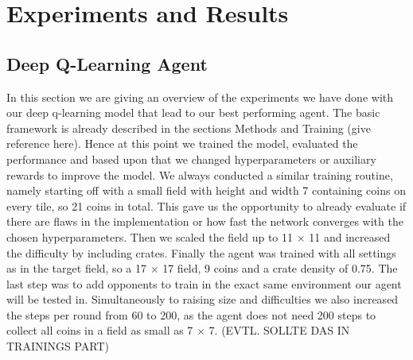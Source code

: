 \section{Experiments and Results}

\subsection{Deep Q-Learning Agent}

In this section we are giving an overview of the experiments we have done with our deep q-learning model that lead to our best performing agent. The basic framework is already described in the sections Methods and Training (give reference here). Hence at this point we trained the model, evaluated the performance and based upon that we changed hyperparameters or auxiliary rewards to improve the model. We always conducted a similar training routine, namely starting off with a small field with height and width 7 containing coins on every tile, so 21 coins in total. This gave us the opportunity to already evaluate if there are flaws in the implementation or how fast the network converges with the chosen hyperparameters. Then we scaled the field up to 11 $\times$ 11 and increased the difficulty by including crates. Finally the agent was trained with all settings as in the target field, so a 17 $\times$ 17 field, 9 coins and a crate density of 0.75. The last step was to add opponents to train in the exact same environment our agent will be tested in. Simultaneously to raising size and difficulties we also increased the steps per round from 60 to 200, as the agent does not need 200 steps to collect all coins in a field as small as 7 $\times$ 7. (EVTL. SOLLTE DAS IN TRAININGS PART)

